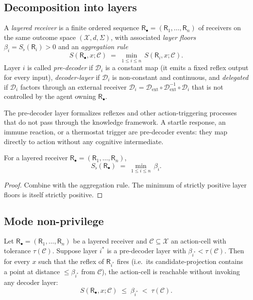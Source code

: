 \documentclass[twocolumn,11pt,a4paper]{article}
\newcommand{\D}{\mathcal{D}}
\newcommand{\X}{\mathcal{X}}
\newcommand{\Cell}{\mathcal{C}}
\newcommand{\receiver}{\mathsf{R}}
\newcommand{\Sfloor}{S_{\flat}}
\begin{document}
\subsection{Decomposition into layers}

\begin{definition}\label{def:layered}
A \emph{layered receiver} is a finite ordered sequence
$\receiver_\bullet=(\receiver_1,\dots,\receiver_n)$ of receivers on the same
outcome space $(\X,d,\Sigma)$, with associated \emph{layer floors}
$\beta_i=\Sfloor(\receiver_i)>0$ and an \emph{aggregation rule}
\[
S(\receiver_\bullet,x;\Cell)\;=\;\min_{1\le i\le n}\,S(\receiver_i,x;\Cell).
\]
Layer $i$ is called \emph{pre-decoder} if $\D_i$ is a constant map (it
emits a fixed reflex output for every input), \emph{decoder-layer} if
$\D_i$ is non-constant and continuous, and \emph{delegated} if $\D_i$
factors through an external receiver
$\D_i=\D_{\mathrm{ext}}\circ\D_{\mathrm{ext}}^{-1}\circ\D_i$ that is not
controlled by the agent owning $\receiver_\bullet$.
\end{definition}

\begin{remark}\label{rem:reflex}
The pre-decoder layer formalizes reflexes and other action-triggering
processes that do not pass through the knowledge framework. A startle
response, an immune reaction, or a thermostat trigger are pre-decoder
events: they map directly to action without any cognitive intermediate.
\end{remark}

\begin{proposition}\label{prop:layered-floor}
For a layered receiver $\receiver_\bullet=(\receiver_1,\dots,\receiver_n)$,
\[
\Sfloor(\receiver_\bullet)\;=\;\min_{1\le i\le n}\,\beta_i.
\]
\end{proposition}

\begin{proof}
Combine  with the aggregation rule. The minimum of
strictly positive layer floors is itself strictly positive.
\end{proof}

\subsection{Mode non-privilege}

\begin{theorem}\label{thm:mode-nonpriv}
Let $\receiver_\bullet=(\receiver_1,\dots,\receiver_n)$ be a layered
receiver and $\Cell\subseteq\X$ an action-cell with tolerance
$\tau(\Cell)$. Suppose layer $i^*$ is a pre-decoder layer with
$\beta_{i^*}<\tau(\Cell)$. Then for every $x$ such that the reflex of
$\receiver_{i^*}$ fires (i.e.\ its candidate-projection contains a point
at distance $\le\beta_{i^*}$ from $\Cell$), the action-cell is reachable
without invoking any decoder layer:
\[
S(\receiver_\bullet,x;\Cell)\;\le\;\beta_{i^*}\;<\;\tau(\Cell).
\]
\end{theorem}
\end{document}
